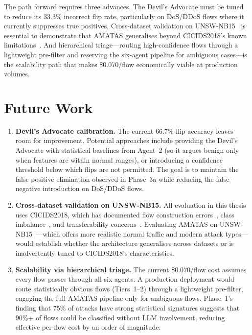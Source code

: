 \documentclass[12pt, a4paper, oneside]{report}
\begin{document}
The path forward requires three advances. The Devil's Advocate must be tuned to
reduce its 33.3\% incorrect flip rate, particularly on DoS/DDoS flows where it
currently suppresses true positives. Cross-dataset validation on
UNSW-NB15~\cite{moustafa2015unswnb15} is essential to demonstrate that AMATAS
generalises beyond CICIDS2018's known limitations~\cite{engelen2021cicids}. And
hierarchical triage---routing high-confidence flows through a lightweight
pre-filter and reserving the six-agent pipeline for ambiguous cases---is the
scalability path that makes \$0.070/flow economically viable at production
volumes.


\section{Future Work}

\begin{enumerate}
  \item \textbf{Devil's Advocate calibration.} The current 66.7\% flip accuracy
        leaves room for improvement. Potential approaches include providing the
        Devil's Advocate with statistical baselines from Agent~2 (so it argues
        benign only when features are within normal ranges), or introducing a
        confidence threshold below which flips are not permitted. The goal is to
        maintain the false-positive elimination observed in Phase~3a while
        reducing the false-negative introduction on DoS/DDoS flows.

  \item \textbf{Cross-dataset validation on UNSW-NB15.} All evaluation in this
        thesis uses CICIDS2018, which has documented flow construction
        errors~\cite{engelen2021cicids, liu2022errors}, class
        imbalance~\cite{panigrahi2018cicids}, and transferability
        concerns~\cite{transferability2022}. Evaluating AMATAS on
        UNSW-NB15~\cite{moustafa2015unswnb15}---which offers more realistic
        normal traffic and modern attack types---would establish whether the
        architecture generalises across datasets or is inadvertently tuned to
        CICIDS2018's characteristics.

  \item \textbf{Scalability via hierarchical triage.} The current \$0.070/flow
        cost assumes every flow passes through all six agents. A production
        deployment would route statistically obvious flows (Tiers~1--2) through
        a lightweight pre-filter, engaging the full AMATAS pipeline only for
        ambiguous flows. Phase~1's finding that 75\% of attacks have strong
        statistical signatures suggests that 90\%+ of flows could be classified
        without LLM involvement, reducing effective per-flow cost by an order of
        magnitude.
\end{enumerate}
\end{document}
